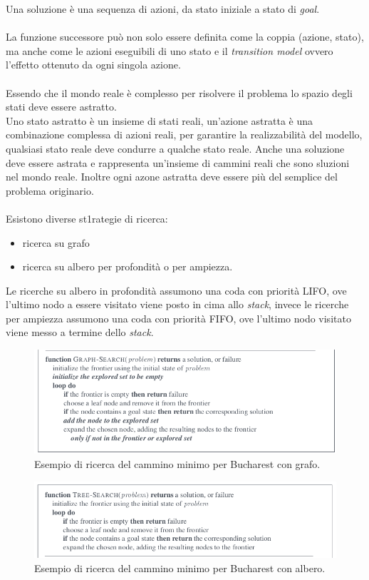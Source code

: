 \documentclass[10pt,a4paper]{book}
\begin{document}
\noindent
Una soluzione \`e una sequenza di azioni, da stato iniziale a stato di \textit{goal}.\\\\
La funzione successore pu\`o non solo essere definita come la coppia (azione, stato), ma anche come le azioni eseguibili di uno stato e il \textit{transition model} ovvero l'effetto ottenuto da ogni singola azione.\\\\
Essendo che il mondo reale \`e complesso per risolvere il problema lo spazio degli stati deve essere astratto.\\
Uno stato astratto \`e un insieme di stati reali, un'azione astratta \`e una combinazione complessa di azioni reali, per garantire la realizzabilit\`a del modello, qualsiasi stato reale deve condurre a qualche stato reale. Anche una soluzione deve essere astrata e rappresenta un'insieme di cammini reali che sono sluzioni nel mondo reale. Inoltre ogni azone astratta deve essere pi\`u del semplice del problema originario.\\\\
Esistono diverse st1rategie di ricerca:
\begin{itemize}
\item ricerca su grafo
\item ricerca su albero per profondit\`a o per ampiezza.
\end{itemize}
\noindent
Le ricerche su albero in profondit\`a assumono una coda con priorit\`a LIFO, ove l'ultimo nodo a essere visitato viene posto in cima allo \textit{stack}, invece le ricerche per ampiezza assumono una coda con priorit\`a FIFO, ove l'ultimo nodo visitato viene messo a termine dello \textit{stack}.

\begin{figure}[H]
\centering
  \includegraphics[width=1\linewidth]{./images/code-grafo.png}
  \caption{Esempio di ricerca del cammino minimo per Bucharest con grafo.}
   \label{fig: esempio-ricerca-grafo}
\end{figure}
\noindent
\begin{figure}[H]
\centering
  \includegraphics[width=1\linewidth]{./images/code-albero.png}
  \caption{Esempio di ricerca del cammino minimo per Bucharest con albero.}
   \label{fig: esempio-ricerca-albero}
\end{figure}
\noindent
\end{document}
